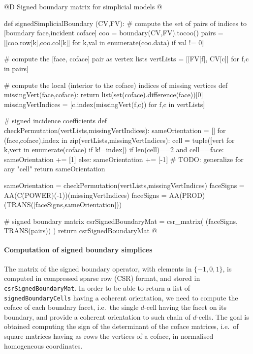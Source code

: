 \documentclass[11pt,oneside]{article}    %
\begin{document}
@D Signed boundary matrix for simplicial models
@{def signedSimplicialBoundary (CV,FV):
    # compute the set of pairs of indices to [boundary face,incident coface]
    coo = boundary(CV,FV).tocoo()
    pairs = [[coo.row[k],coo.col[k]] for k,val in enumerate(coo.data) if val != 0]

    # compute the [face, coface] pair as vertex lists
    vertLists = [[FV[f], CV[c]] for f,c in pairs]

    # compute the local (interior to the coface) indices of missing vertices 
    def missingVert(face,coface): return list(set(coface).difference(face))[0]
    missingVertIndices = [c.index(missingVert(f,c)) for f,c in vertLists]

    # signed incidence coefficients
    def checkPermutation(vertLists,missingVertIndices):
        sameOrientation = []
        for (face,coface),index in zip(vertLists,missingVertIndices):
            cell = tuple([vert for k,vert in enumerate(coface) if k!=index])
            if len(cell)==2 and cell==face: sameOrientation += [1]
            else: sameOrientation += [-1]  # TODO: generalize for any "cell"
        return sameOrientation

    sameOrientation = checkPermutation(vertLists,missingVertIndices)
    faceSigns = AA(C(POWER)(-1))(missingVertIndices)
    faceSigns = AA(PROD)(TRANS([faceSigns,sameOrientation]))

    # signed boundary matrix
    csrSignedBoundaryMat = csr_matrix( (faceSigns, TRANS(pairs)) )
    return csrSignedBoundaryMat
@}

\paragraph{Computation of signed boundary simplices}

The matrix of the signed boundary operator, with elements in $\{-1,0,1\}$, is computed in compressed sparse row (CSR) format, and stored in \texttt{csrSignedBoundaryMat}. In order to be able to return a list of \texttt{signedBoundaryCells} having a coherent orientation, we need to compute the coface of each boundary facet, i.e.~the single $d$-cell having the facet on its boundary, and provide a coherent orientation to such chain of $d$-cells. The goal is obtained computing the sign of the determinant of the coface matrices, i.e.~of square matrices having as rows the vertices of a coface, in normalised homogeneous coordinates.
\end{document}
